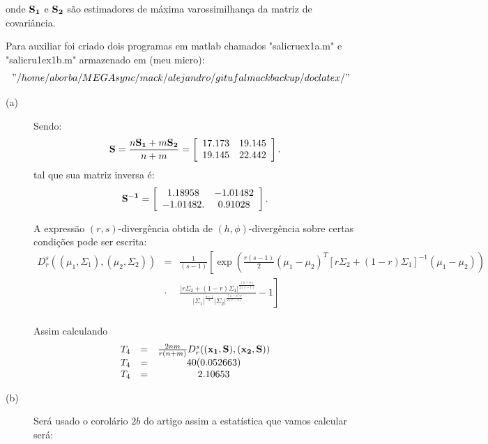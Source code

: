 \documentclass[10pt,a4paper]{article}
\begin{document}
onde ${\bf S_1}$ e ${\bf S_2}$ são estimadores de máxima varossimilhança da matriz de covariância.

Para auxiliar foi criado dois programas em matlab chamados "salicruex1a.m" e "salicru1ex1b.m" armazenado em (meu micro): $$"/home/aborba/MEGAsync/mack/alejandro/gitufalmackbackup/doclatex/"$$


\begin{description}
\item[(a)] Sendo:
$$
		{\bf S}=\frac{n{\bf S_1}+m{\bf S_2}}{n+m} = \left[
\begin{array}{cc}
	 17.173  & 19.145   \\
         19.145  & 22.442   \\
\end{array}
\right].
$$
tal que sua matriz inversa é:
$$
		{\bf S^{-1}} = \left[
\begin{array}{cc}
	 1.18958  & -1.01482   \\
        -1.01482.  & 0.91028   \\
\end{array}
\right].
$$

		A expressão $(r,s)$-divergência obtida de $(h,\phi)$-divergência sobre certas condições pode ser escrita:
\begin{equation}\label{sec3eqn2}
\begin{array}{ccl}
	D_r^s((\mu_1,\Sigma_1),(\mu_2,\Sigma_2))&=&\frac{1}{(s-1)}\left[\exp\left(\frac{r(s-1)}{2}(\mu_1-\mu_2)^{T}[r\Sigma_2+(1-r)\Sigma_1]^{-1}(\mu_1-\mu_2) \right)\right. \\
	&\cdot&\left.\frac{|r\Sigma_2+(1-r)\Sigma_1|^{\frac{(1-s)}{2(r-1)}}}{|\Sigma_1|^{\frac{s-1}{2}}|\Sigma_2|^{\frac{(1-s)r}{2(r-1)}}}-1\right]  \\
\end{array}
\end{equation}

Assim calculando
\begin{equation}\label{sec3eqn3}
\begin{array}{ccc}
	T_4&=&\frac{2nm}{r(n+m)}D_r^s(({\bf x_1}, {\bf S}),({\bf x_2}, {\bf S})) \\
	T_4&=&40(0.052663) \\
	T_4&=&2.10653
\end{array}
\end{equation}
\item[(b)] Será usado o corolário $2b$ do artigo \cite{salicru_pardo_1994} assim a estatística que vamos calcular será:


\end{description}
\end{document}
